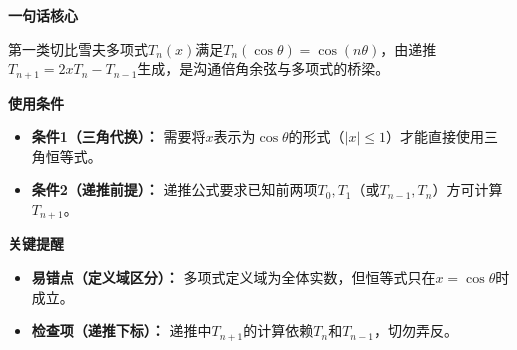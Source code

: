\begin{summarybox}
	\textbf{\textcolor{CSummary}{一句话核心}}

	第一类切比雪夫多项式$T_n(x)$满足$T_n(\cos\theta)=\cos(n\theta)$，由递推$T_{n+1}=2xT_n-T_{n-1}$生成，是沟通倍角余弦与多项式的桥梁。

	\medskip
	\textbf{\textcolor{CSummary}{使用条件}}
	\begin{itemize}[leftmargin=*, itemsep=0.5em, topsep=0.4em]
		\item \textbf{条件1（三角代换）：} 需要将$x$表示为$\cos\theta$的形式（$|x|\le1$）才能直接使用三角恒等式。
		\item \textbf{条件2（递推前提）：} 递推公式要求已知前两项$T_0,T_1$（或$T_{n-1},T_n$）方可计算$T_{n+1}$。
	\end{itemize}

	\medskip
	\textbf{\textcolor{CSummary}{关键提醒}}
	\begin{itemize}[leftmargin=*, itemsep=0.5em, topsep=0.4em]
		\item \textbf{易错点（定义域区分）：} 多项式定义域为全体实数，但恒等式只在$x=\cos\theta$时成立。
		\item \textbf{检查项（递推下标）：} 递推中$T_{n+1}$的计算依赖$T_n$和$T_{n-1}$，切勿弄反。
	\end{itemize}
\end{summarybox}
